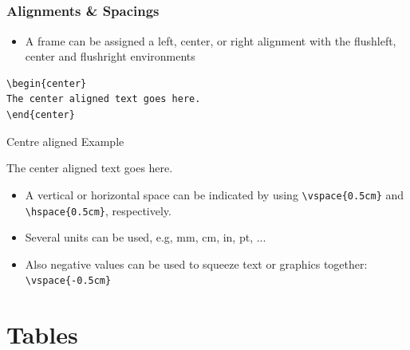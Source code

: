 \documentclass[[newPxFont]{beamer}
\begin{document}
\subsection{}
\begin{frame}[fragile]
  \frametitle{Alignments \& Spacings}
\begin{itemize}
  \item A frame can be assigned a left, center, or right alignment with the
flushleft, center and flushright environments
\end{itemize}
\begin{verbatim}
\begin{center}
The center aligned text goes here.
\end{center}
\end{verbatim}
\begin{block}{Centre aligned Example}
\begin{center}
The center aligned text goes here.
\end{center}
\end{block}
\begin{itemize}
  \item A vertical or horizontal space can be indicated by using \verb+\vspace{0.5cm}+ and \verb+\hspace{0.5cm}+, respectively.
\item Several units can be used, e.g, mm, cm, in, pt, ...
\item Also negative values can be used to squeeze text or graphics together: \verb+\vspace{-0.5cm}+
\end{itemize}
\end{frame}
\section{Tables}
\end{document}
